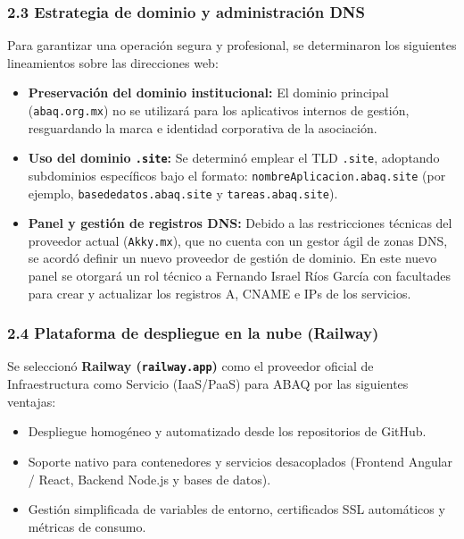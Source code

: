 \documentclass[
]{article}
\providecommand{\tightlist}{%
  \setlength{\itemsep}{0pt}\setlength{\parskip}{0pt}}
\begin{document}
\subsubsection{2.3 Estrategia de dominio y administración
DNS}\label{estrategia-de-dominio-y-administraciuxf3n-dns}

Para garantizar una operación segura y profesional, se determinaron los
siguientes lineamientos sobre las direcciones web:

\begin{itemize}
\tightlist
\item
  \textbf{Preservación del dominio institucional:} El dominio principal
  (\texttt{abaq.org.mx}) no se utilizará para los aplicativos internos
  de gestión, resguardando la marca e identidad corporativa de la
  asociación.
\item
  \textbf{Uso del dominio \texttt{.site}:} Se determinó emplear el TLD
  \texttt{.site}, adoptando subdominios específicos bajo el formato:
  \texttt{nombreAplicacion.abaq.site} (por ejemplo,
  \texttt{basededatos.abaq.site} y \texttt{tareas.abaq.site}).
\item
  \textbf{Panel y gestión de registros DNS:} Debido a las restricciones
  técnicas del proveedor actual (\texttt{Akky.mx}), que no cuenta con un
  gestor ágil de zonas DNS, se acordó definir un nuevo proveedor de
  gestión de dominio. En este nuevo panel se otorgará un rol técnico a
  Fernando Israel Ríos García con facultades para crear y actualizar los
  registros A, CNAME e IPs de los servicios.
\end{itemize}

\subsubsection{2.4 Plataforma de despliegue en la nube
(Railway)}\label{plataforma-de-despliegue-en-la-nube-railway}

Se seleccionó \textbf{Railway (\texttt{railway.app})} como el proveedor
oficial de Infraestructura como Servicio (IaaS/PaaS) para ABAQ por las
siguientes ventajas:

\begin{itemize}
\tightlist
\item
  Despliegue homogéneo y automatizado desde los repositorios de GitHub.
\item
  Soporte nativo para contenedores y servicios desacoplados (Frontend
  Angular / React, Backend Node.js y bases de datos).
\item
  Gestión simplificada de variables de entorno, certificados SSL
  automáticos y métricas de consumo.
\end{itemize}
\end{document}

